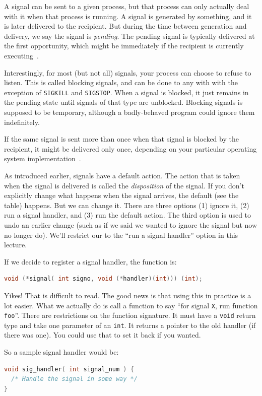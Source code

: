 A signal can be sent to a given process, but that process can only actually deal with it when that process is running. A signal is generated by something, and it is later delivered to the recipient. But during the time between generation and delivery, we say the signal is \textit{pending}. The pending signal is typically delivered at the first opportunity, which might be immediately if the recipient is currently executing~\cite{lpi}.

Interestingly, for most (but not all) signals, your process can choose to refuse to listen.  This is called blocking signals, and can be done to any with with the exception of \texttt{SIGKILL} and \texttt{SIGSTOP}. When a signal is blocked, it just remains in the pending state until signals of that type are unblocked. Blocking signals is supposed to be temporary, although a badly-behaved program could ignore them indefinitely.

If the same signal is sent more than once when that signal is blocked by the recipient, it might be delivered only once, depending on your particular operating system implementation~\cite{apunix}.

As introduced earlier, signals have a default action. The action that is taken when the signal is delivered is called the \textit{disposition} of the signal. If you don't explicitly change what happens when the signal arrives, the default (see the table) happens. But we can change it. There are three options (1) ignore it, (2) run a signal handler, and (3) run the default action. The third option is used to undo an earlier change (such as if we said we wanted to ignore the signal but now no longer do). We'll restrict our to the ``run a signal handler'' option in this lecture.

If we decide to register a signal handler, the function is:
\begin{lstlisting}[language=C]
void (*signal( int signo, void (*handler)(int))) (int);
\end{lstlisting}

Yikes! That is difficult to read. The good news is that using this in practice is a lot easier. What we actually do is call a function to say ``for signal \texttt{X}, run function \texttt{foo}''. There are restrictions on the function signature. It must have a \texttt{void} return type and take one parameter of an \texttt{int}. It returns a pointer to the old handler (if there was one). You could use that to set it back if you wanted.

So a sample signal handler would be:
\begin{lstlisting}[language=C]
void sig_handler( int signal_num ) {
  /* Handle the signal in some way */
}
\end{lstlisting}

